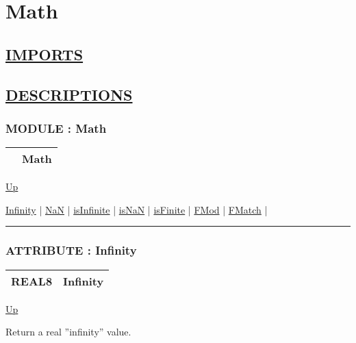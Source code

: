 \chapter*{Math}
\hypertarget{ecldoc:toc:Math}{}

\section*{\underline{IMPORTS}}

\section*{\underline{DESCRIPTIONS}}
\subsection*{MODULE : Math}
\hypertarget{ecldoc:Math}{}

{\renewcommand{\arraystretch}{1.5}
\begin{tabularx}{\textwidth}{|>{\raggedright\arraybackslash}l|X|}
\hline
\hspace{0pt} & Math \\
\hline
\end{tabularx}
}

\hyperlink{ecldoc:toc:root}{Up}

\par


\hyperlink{ecldoc:math.infinity}{Infinity}  |
\hyperlink{ecldoc:math.nan}{NaN}  |
\hyperlink{ecldoc:math.isinfinite}{isInfinite}  |
\hyperlink{ecldoc:math.isnan}{isNaN}  |
\hyperlink{ecldoc:math.isfinite}{isFinite}  |
\hyperlink{ecldoc:math.fmod}{FMod}  |
\hyperlink{ecldoc:math.fmatch}{FMatch}  |

\rule{\textwidth}{0.4pt}

\subsection*{ATTRIBUTE : Infinity}
\hypertarget{ecldoc:math.infinity}{}

{\renewcommand{\arraystretch}{1.5}
\begin{tabularx}{\textwidth}{|>{\raggedright\arraybackslash}l|X|}
\hline
\hspace{0pt}REAL8 & Infinity \\
\hline
\end{tabularx}
}

\hyperlink{ecldoc:Math}{Up}

\par
Return a real ''infinity'' value.


